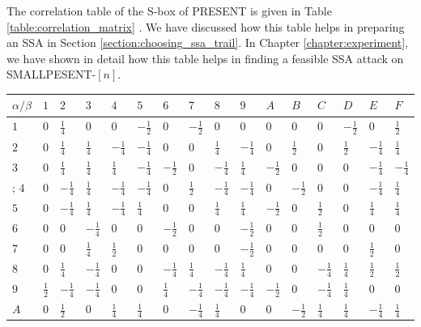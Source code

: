 The correlation table of the S-box of PRESENT is given in Table \ref{table:correlation_matrix} \citep{j_y_cho_linear_cryptanalysis}. We have discussed how this table helps in preparing an SSA in Section \ref{section:choosing_ssa_trail}. In Chapter \ref{chapter:experiment}, we have shown in detail how this table helps in finding a feasible SSA attack on SMALLPESENT-$[n]$.
\begin{table}
\centering
\begin{tiny}
\begin{tabular}{|l|l|l|l|l|l|l|l|l|l|l|l|l|l|l|l|}
\hline
$\alpha / \beta$&$1$&$2$&$3$&$4$&$5$&$6$&$7$&$8$&$9$&$A$&$B$&$C$&$D$&$E$&$F$ \\
\hline
$1$&$0$&$\frac{1}{4}$&$0$&$0$&$-\frac{1}{2}$&$0$&$-\frac{1}{2}$&$0$&$0$&$0$&$0$&$0$&$-\frac{1}{2}$&$0$&$\frac{1}{2}$  \\ \hline
$2$&$0$&$\frac{1}{4}$&$\frac{1}{4}$&$-\frac{1}{4}$&$-\frac{1}{4}$&$0$&$0$&$\frac{1}{4}$&$-\frac{1}{4}$&$0$&$\frac{1}{2}$&$0$&$\frac{1}{2}$&$-\frac{1}{4}$&$\frac{1}{4}$  \\ \hline
$3$&$0$&$\frac{1}{4}$&$\frac{1}{4}$&$\frac{1}{4}$&$-\frac{1}{4}$&$-\frac{1}{2}$&$0$&$-\frac{1}{4}$&$\frac{1}{4}$&$-\frac{1}{2}$&$0$&$0$&$0$&$-\frac{1}{4}$&$-\frac{1}{4}$  \\ \hline;
$4$&$0$&$-\frac{1}{4}$&$\frac{1}{4}$&$-\frac{1}{4}$&$-\frac{1}{4}$&$0$&$\frac{1}{2}$&$-\frac{1}{4}$&$-\frac{1}{4}$&$0$&$-\frac{1}{2}$&$0$&$0$&$-\frac{1}{4}$&$\frac{1}{4}$  \\ \hline
$5$&$0$&$-\frac{1}{4}$&$\frac{1}{4}$&$-\frac{1}{4}$&$\frac{1}{4}$&$0$&$0$&$\frac{1}{4}$&$\frac{1}{4}$&$-\frac{1}{2}$&$0$&$\frac{1}{2}$&$0$&$\frac{1}{4}$&$\frac{1}{4}$  \\ \hline
$6$&$0$&$0$&$-\frac{1}{4}$&$0$&$0$&$-\frac{1}{2}$&$0$&$0$&$-\frac{1}{2}$&$0$&$0$&$\frac{1}{2}$&$0$&$0$&$0$  \\ \hline
$7$&$0$&$0$&$\frac{1}{4}$&$\frac{1}{2}$&$0$&$0$&$0$&$0$&$-\frac{1}{2}$&$0$&$0$&$0$&$0$&$\frac{1}{2}$&$0$  \\ \hline
$8$&$0$&$\frac{1}{4}$&$-\frac{1}{4}$&$0$&$0$&$-\frac{1}{4}$&$\frac{1}{4}$&$-\frac{1}{4}$&$\frac{1}{4}$&$0$&$0$&$-\frac{1}{4}$&$\frac{1}{4}$&$\frac{1}{2}$&$\frac{1}{2}$  \\ \hline
$9$&$\frac{1}{2}$&$-\frac{1}{4}$&$-\frac{1}{4}$&$0$&$0$&$\frac{1}{4}$&$-\frac{1}{4}$&$-\frac{1}{4}$&$-\frac{1}{4}$&$-\frac{1}{2}$&$0$&$-\frac{1}{4}$&$\frac{1}{4}$&$0$& $0$  \\ \hline
$A$&$0$&$\frac{1}{2}$&$0$&$\frac{1}{4}$&$\frac{1}{4}$&$0$&$-\frac{1}{4}$&$\frac{1}{4}$&$0$&$0$&$-\frac{1}{2}$&$\frac{1}{4}$&$\frac{1}{4}$&$-\frac{1}{4}$&$\frac{1}{4}$  \\ \hline

\end{tabular}
\end{tiny}
\end{table}
